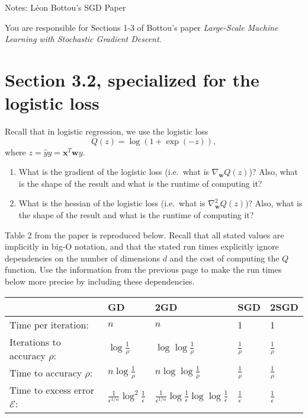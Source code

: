 \documentclass[10pt]{exam}
\theoremstyle{definition}
\newcommand{\trans}[1]{{#1}^{T}}
\newcommand{\w}{\mathbf w}
\newcommand{\x}{\mathbf x}
\begin{document}
\begin{center}
{
\Huge
Notes: L\'eon Bottou's SGD Paper
}
\end{center}

You are responsible for Sections 1-3 of Bottou's paper \emph{Large-Scale Machine Learning with Stochastic Gradient Descent}.

\section*{Section 3.2, specialized for the logistic loss}

Recall that in logistic regression, we use the logistic loss
\begin{equation}
    Q(z) = \log(1+\exp(-z))
    ,
\end{equation}
where $z = \hat y y = \trans \x \w y$.

\begin{enumerate}
    \item
        What is the gradient of the logistic loss (i.e.\ what is $\nabla_\w Q(z)$)?
        Also, what is the shape of the result and what is the runtime of computing it?
        \vspace{3in}

    \item
        What is the hessian of the logistic loss (i.e.\ what is $\nabla_\w^2 Q(z)$)?
        Also, what is the shape of the result and what is the runtime of computing it?
        \vspace{3in}
\end{enumerate}

\noindent
Table 2 from the paper is reproduced below.
Recall that all stated values are implicitly in big-O notation,
and that the stated run times explicitly ignore dependencies on the number of dimensions $d$ and the cost of computing the $Q$ function.
Use the information from the previous page to make the run times below more precise by including these dependencies.

\vspace{0.15in}
\begin{center}
    \renewcommand*{\arraystretch}{3}
    \begin{tabular}{lC{1in}C{1in}C{1in}C{1in}}
    \toprule
    & GD & 2GD & SGD & 2SGD \\
    \midrule
    Time per iteration: & $n$ & $n$ & 1 & 1 \\
    Iterations to accuracy $\rho$: & $\log\tfrac 1 \rho$ & $\log\log\tfrac 1 \rho$ & $\tfrac1\rho$  & $\tfrac1\rho$  \\
    Time to accuracy $\rho$: & $n\log\tfrac1\rho$ & $n\log\log\tfrac 1 \rho$ & $\tfrac 1\rho$ & $\tfrac 1\rho$ \\
    Time to excess error $\mathcal E$: & $\tfrac 1 {\epsilon^{1/\alpha}} \log^2 \tfrac 1\epsilon$ & $\tfrac1{\epsilon^{1/\alpha}}\log\tfrac 1 \epsilon \log\log \tfrac 1 \epsilon$ & $\tfrac 1 \epsilon$ & $\tfrac 1 \epsilon$ \\
    \bottomrule
\end{tabular}
\end{center}
\end{document}
